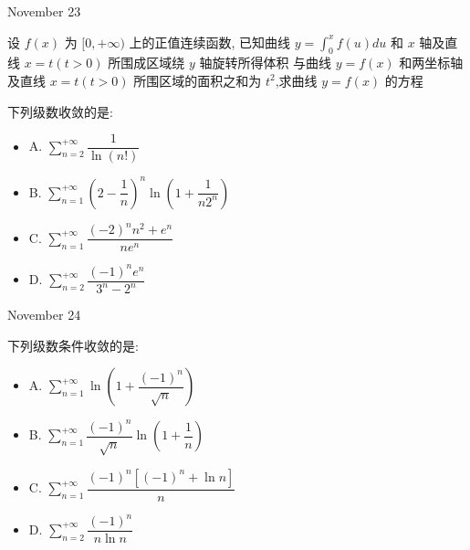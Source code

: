 \begin{solution}
	
\end{solution}


\textcolor{purplea}{November 23}

\begin{example}[][Exam: 37.4.3]
	设 $f(x)$ 为 $[0,+\infty)$ 上的正值连续函数,
已知曲线 $y=\int_{0}^{x}f(u)du$ 和 $x$ 轴及直线 $x=t(t>0)$ 所围成区域绕 $y$ 轴旋转所得体积
与曲线 $y=f(x)$ 和两坐标轴及直线 $x=t(t>0)$ 所围区域的面积之和为 $t^2$,求曲线 $y=f(x)$ 的方程
\end{example}

\begin{solution}
	
\end{solution}

\begin{example}[][Exam: 37.4.4]
	下列级数收敛的是:
\begin{itemize}
	\item A. $\sum\limits_{n=2}^{+\infty}\dfrac{1}{\ln(n!)}$
	\item B. $\sum\limits_{n=1}^{+\infty}(2-\dfrac{1}{n})^{n}\ln(1+\dfrac{1}{n2^{n}})$
	\item C. $\sum\limits_{n=1}^{+\infty}\dfrac{(-2)^{n}n^2+e^{n}}{ne^{n}}$
	\item D. $\sum\limits_{n=2}^{+\infty}\dfrac{(-1)^{n}e^{n}}{3^{n}-2^{n}}$
\end{itemize}
\end{example}

\begin{solution}
	
\end{solution}


\textcolor{purplea}{November 24}

\begin{example}[][Exam: 37.4.5]
	下列级数条件收敛的是:
\begin{itemize}
	\item A. $\sum\limits_{n=1}^{+\infty}\ln\left( 1+\dfrac{(-1)^n}{\sqrt{n}}\right) $
	\item B. $\sum\limits_{n=1}^{+\infty}\dfrac{(-1)^n}{\sqrt{n}}\ln(1+\dfrac{1}{n})$
	\item C. $\sum\limits_{n=1}^{+\infty}\dfrac{(-1)^{n}\left[(-1)^{n}+\ln n \right] }{n}$
	\item D. $\sum\limits_{n=2}^{+\infty}\dfrac{(-1)^{n}}{n\ln n}$
\end{itemize}
\end{example}

